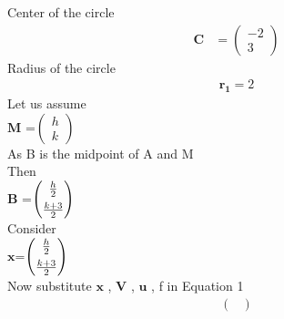 \documentclass[10pt,a4paper]{report}
\newcommand{\myvec}[1]{\ensuremath{\begin{pmatrix}#1\end{pmatrix}}}
\let\vec\mathbf
\begin{document}
\begin{multicols}{2}
Center of the circle 
\begin{align} 
\vec{C} &= \myvec{-2 \\ 3} 
\end{align}
Radius of the circle
\begin{align}
{\vec{r_1}=2}
\end{align}
Let us assume %
\vspace{0.25cm}
\\$\vec{M}$ =$\myvec{h \\ k}$
\vspace{0.25cm}\\
As B is the midpoint of A and M
\vspace{0.25cm}\\
Then 
\vspace{0.25cm}\\
$\vec{B}$ =$\myvec{\frac{h}{2} \vspace{0.15cm}\\ \frac{k+3}{2}}$
\vspace{0.25cm}\\
Consider 
\vspace{0.25cm}\\
$\vec{x}$=$\myvec{\frac{h}{2} \vspace{0.15cm}\\ \frac{k+3}{2}}$
\vspace{0.25cm}\\
Now substitute $\vec{x}$ , $\vec{V}$ , $\vec{u}$ , f in Equation 1\vspace{0.25cm}\\
\begin{align}
\begin{pmatrix} 

\end{pmatrix}
\end{align}
\end{multicols}
\end{document}
